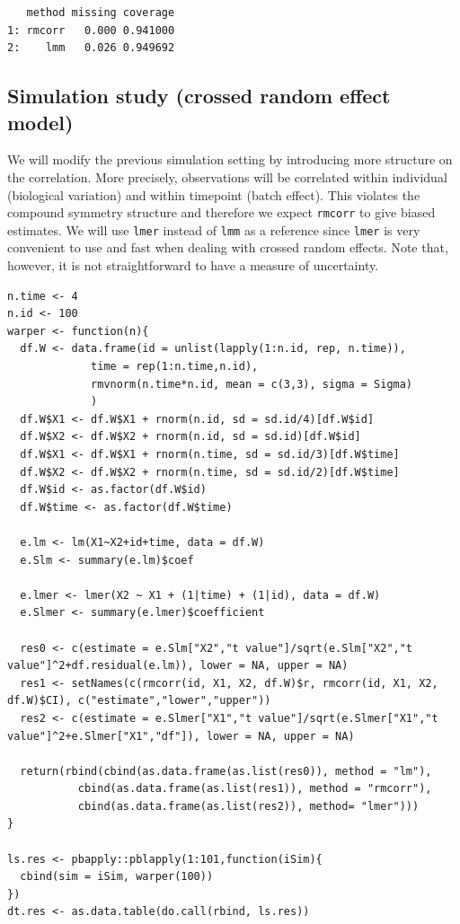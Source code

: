 \documentclass[12pt]{article}
\begin{document}
\begin{verbatim}
   method missing coverage
1: rmcorr   0.000 0.941000
2:    lmm   0.026 0.949692
\end{verbatim}

\subsection{Simulation study (crossed random effect model)}
\label{sec:org323f216}

We will modify the previous simulation setting by introducing more
structure on the correlation. More precisely, observations will be
correlated within individual (biological variation) and within
timepoint (batch effect). This violates the compound symmetry
structure and therefore we expect \texttt{rmcorr} to give biased
estimates. We will use \texttt{lmer} instead of \texttt{lmm} as a reference since
\texttt{lmer} is very convenient to use and fast when dealing with crossed
random effects. Note that, however, it is not straightforward to have a
measure of uncertainty.

\lstset{language=r,label= ,caption= ,captionpos=b,numbers=none}
\begin{lstlisting}
n.time <- 4
n.id <- 100
warper <- function(n){
  df.W <- data.frame(id = unlist(lapply(1:n.id, rep, n.time)),
		     time = rep(1:n.time,n.id),
		     rmvnorm(n.time*n.id, mean = c(3,3), sigma = Sigma)
		     )
  df.W$X1 <- df.W$X1 + rnorm(n.id, sd = sd.id/4)[df.W$id]
  df.W$X2 <- df.W$X2 + rnorm(n.id, sd = sd.id)[df.W$id]
  df.W$X1 <- df.W$X1 + rnorm(n.time, sd = sd.id/3)[df.W$time]
  df.W$X2 <- df.W$X2 + rnorm(n.time, sd = sd.id/2)[df.W$time]
  df.W$id <- as.factor(df.W$id)
  df.W$time <- as.factor(df.W$time)

  e.lm <- lm(X1~X2+id+time, data = df.W)
  e.Slm <- summary(e.lm)$coef

  e.lmer <- lmer(X2 ~ X1 + (1|time) + (1|id), data = df.W)
  e.Slmer <- summary(e.lmer)$coefficient

  res0 <- c(estimate = e.Slm["X2","t value"]/sqrt(e.Slm["X2","t value"]^2+df.residual(e.lm)), lower = NA, upper = NA)
  res1 <- setNames(c(rmcorr(id, X1, X2, df.W)$r, rmcorr(id, X1, X2, df.W)$CI), c("estimate","lower","upper"))
  res2 <- c(estimate = e.Slmer["X1","t value"]/sqrt(e.Slmer["X1","t value"]^2+e.Slmer["X1","df"]), lower = NA, upper = NA)

  return(rbind(cbind(as.data.frame(as.list(res0)), method = "lm"),
	       cbind(as.data.frame(as.list(res1)), method = "rmcorr"),
	       cbind(as.data.frame(as.list(res2)), method= "lmer")))
}

ls.res <- pbapply::pblapply(1:101,function(iSim){
  cbind(sim = iSim, warper(100))
})
dt.res <- as.data.table(do.call(rbind, ls.res))
\end{lstlisting}
\end{document}

